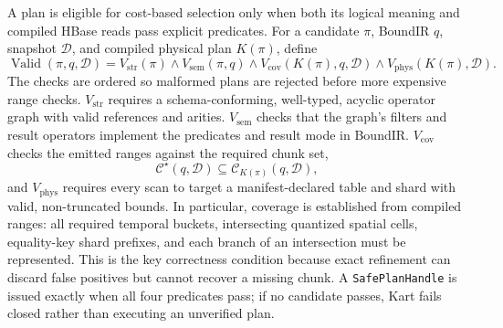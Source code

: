A plan is eligible for cost-based selection only when both its logical meaning and compiled HBase reads pass explicit predicates. For a candidate $\pi$, BoundIR $q$, snapshot $\mathcal{D}$, and compiled physical plan $K(\pi)$, define
\begin{equation}\label{eq:method-validation}
\operatorname{Valid}(\pi,q,\mathcal{D})
=V_{\mathrm{str}}(\pi)\land V_{\mathrm{sem}}(\pi,q)
 \land V_{\mathrm{cov}}(K(\pi),q,\mathcal{D})
 \land V_{\mathrm{phys}}(K(\pi),\mathcal{D}).
\end{equation}
The checks are ordered so malformed plans are rejected before more expensive range checks. $V_{\mathrm{str}}$ requires a schema-conforming, well-typed, acyclic operator graph with valid references and arities. $V_{\mathrm{sem}}$ checks that the graph's filters and result operators implement the predicates and result mode in BoundIR. $V_{\mathrm{cov}}$ checks the emitted ranges against the required chunk set,
\begin{equation}\label{eq:method-coverage}
\mathcal{C}^{\star}(q,\mathcal{D})\subseteq\mathcal{C}_{K(\pi)}(q,\mathcal{D}),
\end{equation}
and $V_{\mathrm{phys}}$ requires every scan to target a manifest-declared table and shard with valid, non-truncated bounds. In particular, coverage is established from compiled ranges: all required temporal buckets, intersecting quantized spatial cells, equality-key shard prefixes, and each branch of an intersection must be represented. This is the key correctness condition because exact refinement can discard false positives but cannot recover a missing chunk. A \texttt{SafePlanHandle} is issued exactly when all four predicates pass; if no candidate passes, Kart fails closed rather than executing an unverified plan.

